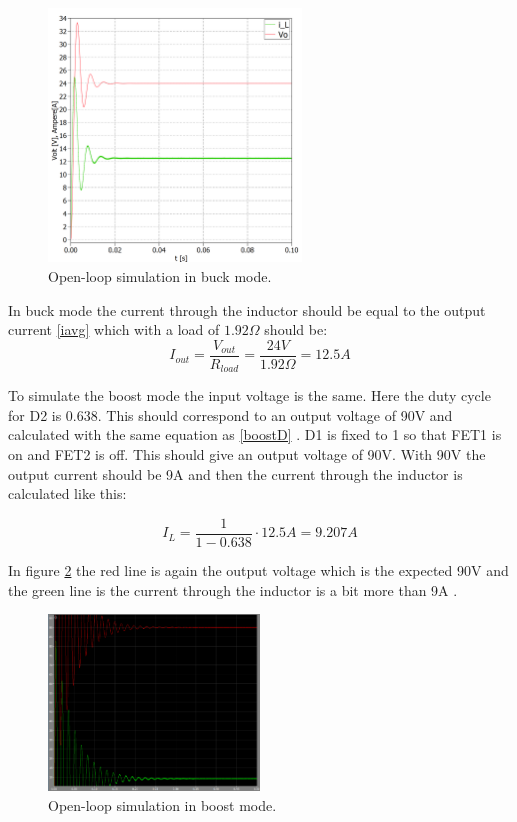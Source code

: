 \begin{figure}[H]
 	\begin{center}
 		\includegraphics[width=0.6\textwidth]{../Pictures/P1/Open_loop_simulation/open_loop_buck}
 		\caption{Open-loop simulation in buck mode.}
 		\label{bucksimulation}
 	\end{center}
\end{figure} 

In buck mode the current through the inductor should be equal to the output current \ref{iavg}  which with a load of $1.92\Omega$ should be:
\begin{equation}
I_{out} = \frac{V_{out}}{R_{load}} = \frac{24V}{1.92\Omega} = 12.5A
\end{equation}   

To simulate the boost mode the input voltage is the same. Here the duty cycle for D2 is 0.638. This should correspond to an output voltage of 90V and calculated with the same equation as \ref{boostD} . D1 is fixed to 1 so that FET1 is on and FET2 is off. This should give an output voltage of 90V. With 90V the output current should be 9A and then the current through the inductor is calculated like this:

\begin{equation}
I_{L} = \frac{1}{1-0.638}\cdot 12.5A = 9.207A
\end{equation}  

In figure \ref{boostsim} the red line is again the output voltage which is the expected 90V and the green line is the current through the inductor is a bit more than 9A .

\begin{figure}[H]
	\begin{center}
		\includegraphics[width=0.5\textwidth]{../Pictures/boostsim}
		\caption{Open-loop simulation in boost mode.}
		\label{boostsim}
	\end{center}
\end{figure}

